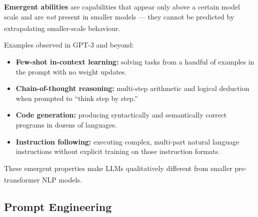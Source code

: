 \begin{tcbitemize}[ skin=sectionraster ]
    \tcbitem[title={Emergent Abilities of Large Models}, raster multicolumn=6]
    \textbf{Emergent abilities} are capabilities that appear only above a certain model
    scale and are \emph{not} present in smaller models --- they cannot be predicted by
    extrapolating smaller-scale
    behaviour.\textsuperscript{\cite[][p.~107]{farrisHowLargeLanguage2025}}

    Examples observed in GPT-3 and beyond:
    \begin{itemize}
        \item \textbf{Few-shot in-context learning:} solving tasks from a handful of
              examples in the prompt with no weight updates.
        \item \textbf{Chain-of-thought reasoning:} multi-step arithmetic and logical
              deduction when prompted to ``think step by step.''
        \item \textbf{Code generation:} producing syntactically and semantically correct
              programs in dozens of languages.
        \item \textbf{Instruction following:} executing complex, multi-part natural
              language instructions without explicit training on those instruction formats.
    \end{itemize}
    These emergent properties make LLMs qualitatively different from smaller
    pre-transformer NLP
    models.\textsuperscript{\cite[][p.~114]{farrisHowLargeLanguage2025}}

\end{tcbitemize}

\subsection{Prompt Engineering}

